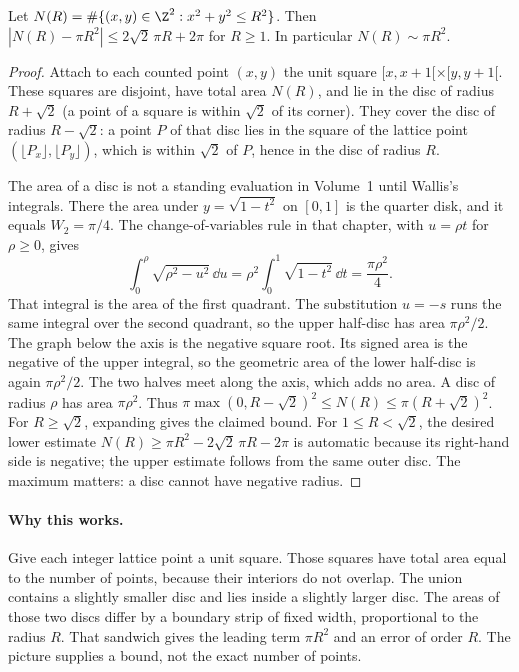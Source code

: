 \begin{theorem}[Gauss]\label{thm:circle}
Let $N(R)=\#\{(x,y)\in\Z^2:x^2+y^2\le R^2\}$. Then $\left|N(R)-\pi R^2\right|\le2\sqrt2\,\pi R+2\pi$ for $R\ge1$. In particular $N(R)\sim\pi R^2$.
\end{theorem}
\begin{proof}
Attach to each counted point $(x,y)$ the unit square $[x,x+1[\times[y,y+1[$. These squares are disjoint, have total area $N(R)$, and lie in the disc of radius $R+\sqrt2$ (a point of a square is within $\sqrt2$ of its corner). They cover the disc of radius $R-\sqrt2$: a point $P$ of that disc lies in the square of the lattice point $(\lfloor P_x\rfloor,\lfloor P_y\rfloor)$, which is within $\sqrt2$ of $P$, hence in the disc of radius $R$.

The area of a disc is not a standing evaluation in Volume~1 until Wallis's integrals. There the area under $y=\sqrt{1-t^2}$ on $[0,1]$ is the quarter disk, and it equals $W_2=\pi/4$. The change-of-variables rule in that chapter, with $u=\rho t$ for $\rho\ge0$, gives
\[
\int_0^\rho\sqrt{\rho^2-u^2}\,\dd u
=\rho^2\int_0^1\sqrt{1-t^2}\,\dd t
=\frac{\pi\rho^2}4.
\]
That integral is the area of the first quadrant. The substitution $u=-s$ runs the same integral over the second quadrant, so the upper half-disc has area $\pi\rho^2/2$. The graph below the axis is the negative square root. Its signed area is the negative of the upper integral, so the geometric area of the lower half-disc is again $\pi\rho^2/2$. The two halves meet along the axis, which adds no area. A disc of radius $\rho$ has area $\pi\rho^2$. Thus $\pi\max(0,R-\sqrt2)^2\le N(R)\le\pi(R+\sqrt2)^2$. For $R\ge\sqrt2$, expanding gives the claimed bound. For $1\le R<\sqrt2$, the desired lower estimate $N(R)\ge\pi R^2-2\sqrt2\,\pi R-2\pi$ is automatic because its right-hand side is negative; the upper estimate follows from the same outer disc. The maximum matters: a disc cannot have negative radius.
\end{proof}

\paragraph{Why this works.}
Give each integer lattice point a unit square. Those squares have total area equal to the number of points, because their interiors do not overlap. The union contains a slightly smaller disc and lies inside a slightly larger disc. The areas of those two discs differ by a boundary strip of fixed width, proportional to the radius $R$. That sandwich gives the leading term $\pi R^2$ and an error of order $R$. The picture supplies a bound, not the exact number of points.

